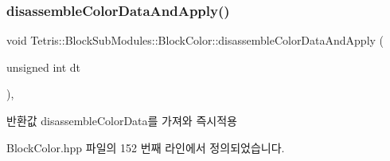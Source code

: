 \subsubsection{\texorpdfstring{disassemble\+Color\+Data\+And\+Apply()}{disassembleColorDataAndApply()}}
{\footnotesize\ttfamily void Tetris\+::\+Block\+Sub\+Modules\+::\+Block\+Color\+::disassemble\+Color\+Data\+And\+Apply (\begin{DoxyParamCaption}\item[{unsigned int}]{dt }\end{DoxyParamCaption})\hspace{0.3cm}{\ttfamily [inline]}, {\ttfamily [private]}}

\begin{DoxyReturn}{반환값}
disassemble\+Color\+Data를 가져와 즉시적용 
\end{DoxyReturn}


Block\+Color.\+hpp 파일의 152 번째 라인에서 정의되었습니다.


